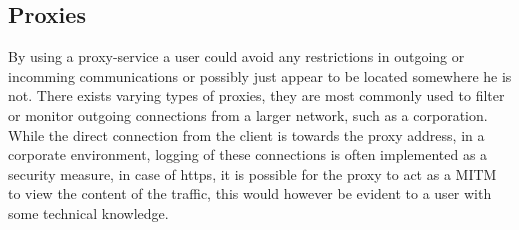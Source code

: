 \subsection{Proxies}
By using a proxy-service a user could avoid any restrictions in outgoing or incomming communications or possibly just appear to be located somewhere he is not. There exists varying types of proxies, they are most commonly used to filter or monitor outgoing connections from a larger network, such as a corporation. While the direct connection from the client is towards the proxy address, in a corporate environment, logging of these connections is often implemented as a security measure, in case of https, it is possible for the proxy to act as a MITM to view the content of the traffic, this would however be evident to a user with some technical knowledge.


